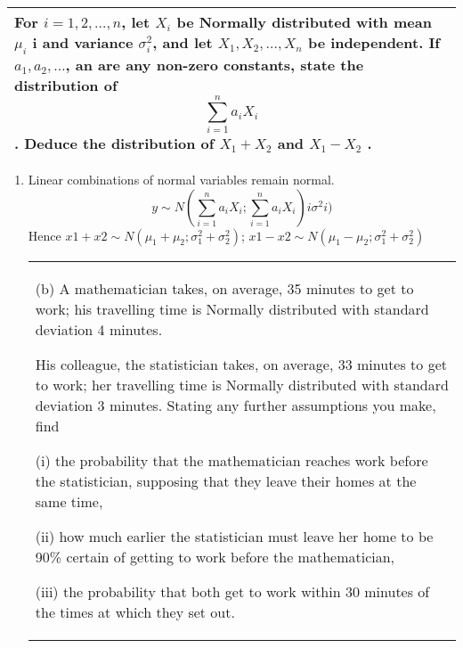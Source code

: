 \documentclass[a4paper,12pt]{article}
\begin{document}
\begin{table}[ht!]
     \centering
     \begin{tabular}{|p{15cm}|}
     \hline        
For $i = 1, 2, \ldots, n$, let $X_i$ be Normally distributed with mean $\mu_i$ i and variance $\sigma^2_i$, and let $X_1, X_2, \ldots, X_n$ be independent.  If $a_1, a_2, \ldots$, an are any 
non-zero constants, state the distribution of 
\[  \sum^{n}_{i=1} a_iX_i\] .  Deduce the 
distribution of $X_1 + X_2$ and $X_1 - X_2$ . 
 \\ \hline
      \end{tabular}
    \end{table}
    

    

\begin{enumerate}
    \item 
Linear combinations of normal variables remain normal.
\[
y \sim N( \sum^{n}_{i=1} a_iX_i;  \sum^{n}_{i=1} a_iX_i)
i \sigma^2
i )\]
Hence $x1 + x2 \sim N(\mu_1 + \mu_2; \sigma^2_1 + \sigma^2_2)$; $x1 - x2 \sim N(\mu_1 - \mu_2; \sigma^2_1 + \sigma^2_2)$
\newpage
  \begin{table}[ht!]
     \centering
     \begin{tabular}{|p{15cm}|}
     \hline  
 
(b) A mathematician takes, on average, 35 minutes to get to work;  his travelling time is Normally distributed with standard deviation 4 minutes.  

His colleague, the statistician takes, on average, 33 minutes to get to work;  her travelling time is Normally distributed with standard deviation 3 minutes.  Stating any further assumptions you make, find 
 
(i) the probability that the mathematician reaches work before the statistician, supposing that they leave their homes at the same time, 
 
(ii) how much earlier the statistician must leave her home to be 90\% certain of getting to work before the mathematician, 
 
(iii) the probability that both get to work within 30 minutes of the times at which they set out. 
 

\end{tabular}
\end{table}
\end{enumerate}
\end{document}
